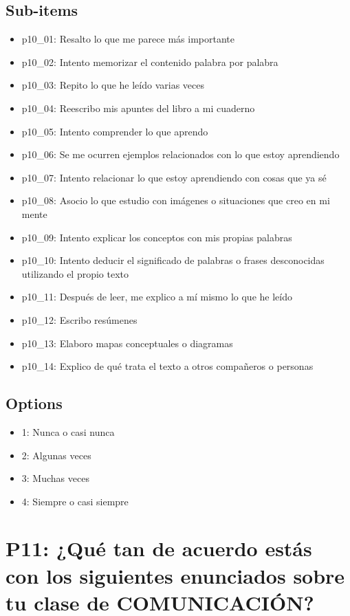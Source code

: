 \documentclass[11pt]{article}
\begin{document}
\subsection*{Sub-items}
\begin{itemize}[leftmargin=*]
  \item p10\_01: Resalto lo que me parece más importante
  \item p10\_02: Intento memorizar el contenido palabra por palabra
  \item p10\_03: Repito lo que he leído varias veces
  \item p10\_04: Reescribo mis apuntes del libro a mi cuaderno
  \item p10\_05: Intento comprender lo que aprendo
  \item p10\_06: Se me ocurren ejemplos relacionados con lo que estoy aprendiendo
  \item p10\_07: Intento relacionar lo que estoy aprendiendo con cosas que ya sé
  \item p10\_08: Asocio lo que estudio con imágenes o situaciones que creo en mi mente
  \item p10\_09: Intento explicar los conceptos con mis propias palabras
  \item p10\_10: Intento deducir el significado de palabras o frases desconocidas utilizando el propio texto
  \item p10\_11: Después de leer, me explico a mí mismo lo que he leído
  \item p10\_12: Escribo resúmenes
  \item p10\_13: Elaboro mapas conceptuales o diagramas
  \item p10\_14: Explico de qué trata el texto a otros compañeros o personas
\end{itemize}
\subsection*{Options}
\begin{itemize}[leftmargin=*]
  \item 1: Nunca o casi nunca
  \item 2: Algunas veces
  \item 3: Muchas veces
  \item 4: Siempre o casi siempre
\end{itemize}
\bigskip
\section*{P11: ¿Qué tan de acuerdo estás con los siguientes enunciados sobre tu clase de COMUNICACIÓN?}
\end{document}
